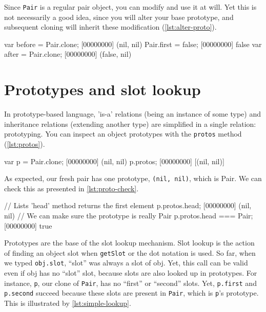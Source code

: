 \documentclass[openright,twoside,12pt]{report}
\begin{document}
Since \lstinline|Pair| is a regular pair object, you can modify and
use it at will. Yet this is not necessarily a good idea, since you
will alter your base prototype, and subsequent cloning will inherit
these modification (\autoref{lst:alter-proto}).

\begin{urbiscript}[caption=Altering a prototype, label=lst:alter-proto]
var before = Pair.clone;
[00000000] (nil, nil)
Pair.first = false;
[00000000] false
var after = Pair.clone;
[00000000] (false, nil)
\end{urbiscript}

\section{Prototypes and slot lookup}

In prototype-based language, 'is-a' relations (being an instance of
some type) and inheritance relations (extending another type) are
simplified in a single relation: prototyping. You can inspect an
object prototypes with the \texttt{protos} method (\autoref{lst:protos}).

\begin{urbiscript}[caption=Inspecting prototypes, label=lst:protos,
  name=protos]
var p = Pair.clone;
[00000000] (nil, nil)
p.protos;
[00000000] [(nil, nil)]
\end{urbiscript}

As expected, our fresh pair has one prototype, \lstinline|(nil, nil)|,
which is Pair. We can check this as presented in \autoref{lst:proto-check}.

\begin{urbiscript}[caption=Checking the prototype,
  label=lst:proto-check, name=protos]
// Lists 'head' method returns the first element
p.protos.head;
[00000000] (nil, nil)
// We can make sure the prototype is really Pair
p.protos.head === Pair;
[00000000] true
\end{urbiscript}

Prototypes are the base of the slot lookup mechanism. Slot lookup is
the action of finding an object slot when \texttt{getSlot} or the dot
notation is used. So far, when we typed \lstinline|obj.slot|, ``slot''
was always a slot of obj. Yet, this call can be valid even if obj has
no ``slot'' slot, because slots are also looked up in prototypes. For
instance, \lstinline|p|, our clone of \lstinline|Pair|, has no
``first'' or ``second'' slots. Yet, \lstinline|p.first| and
\lstinline|p.second| succeed because these slots are present in
\lstinline|Pair|, which is \lstinline|p|'s prototype. This is
illustrated by \autoref{lst:simple-lookup}.
\end{document}
